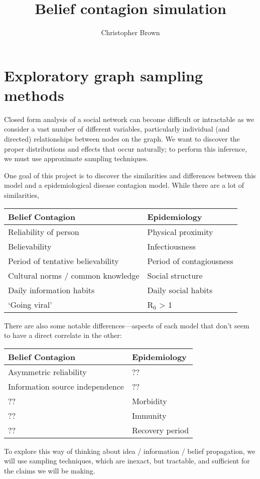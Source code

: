 \documentclass[11pt]{article}
\author{Christopher Brown}
\title{Belief contagion simulation}
\begin{document}
\maketitle


\section{Exploratory graph sampling methods}

Closed form analysis of a social network can become difficult or intractable as we consider a vast number of different variables, particularly individual (and directed) relationships between nodes on the graph.
We want to discover the proper distributions and effects that occur naturally; to perform this inference, we must use approximate sampling techniques.

One goal of this project is to discover the similarities and differences between this model and a epidemiological disease contagion model. While there are a lot of similarities,
\begin{center}
  \begin{tabular}{p{2.5in}p{2in}}
    Belief Contagion & Epidemiology \\
    \toprule
    Reliability of person & Physical proximity \\
    Believability & Infectiousness \\
    Period of tentative believability & Period of contagiousness \\
    Cultural norms / common knowledge & Social structure \\
    Daily information habits & Daily social habits \\
    `Going viral' & R$_0$ > 1 \\
  \end{tabular}
\end{center}
There are also some notable differences---aspects of each model that don't seem to have a direct correlate in the other:
\begin{center}
  \begin{tabular}{p{2.5in}p{2in}}
    Belief Contagion & Epidemiology \\
    \toprule
    Asymmetric reliability & ?? \\
    Information source independence & ?? \\
    ?? & Morbidity \\
    ?? & Immunity \\
    ?? & Recovery period \\
  \end{tabular}
\end{center}
To explore this way of thinking about idea / information / belief propagation, we will use sampling techniques, which are inexact, but tractable, and sufficient for the claims we will be making.
\end{document}
